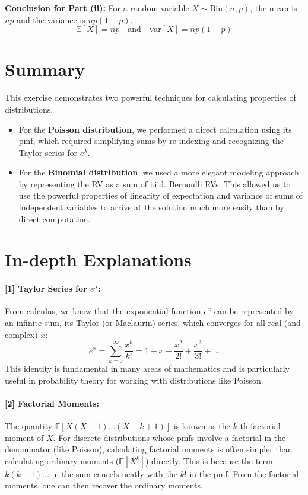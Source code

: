 \documentclass[11pt,a4paper]{article}
\theoremstyle{named}
\begin{document}
\textbf{Conclusion for Part (ii):} For a random variable $X \sim \text{Bin}(n,p)$, the mean is $np$ and the variance is $np(1-p)$.
\[
\mathbb{E}[X] = np \quad \text{and} \quad \text{var}[X] = np(1-p)
\]

\section{Summary}
This exercise demonstrates two powerful techniques for calculating properties of distributions.
\begin{itemize}
    \item For the \textbf{Poisson distribution}, we performed a direct calculation using its pmf, which required simplifying sums by re-indexing and recognizing the Taylor series for $e^\lambda$.
    \item For the \textbf{Binomial distribution}, we used a more elegant modeling approach by representing the RV as a sum of i.i.d. Bernoulli RVs. This allowed us to use the powerful properties of linearity of expectation and variance of sums of independent variables to arrive at the solution much more easily than by direct computation.
\end{itemize}

\newpage
\section*{In-depth Explanations}
\label{note:1}
\paragraph{[1] Taylor Series for $e^\lambda$:}
From calculus, we know that the exponential function $e^x$ can be represented by an infinite sum, its Taylor (or Maclaurin) series, which converges for all real (and complex) $x$:
\[
e^x = \sum_{k=0}^{\infty} \frac{x^k}{k!} = 1 + x + \frac{x^2}{2!} + \frac{x^3}{3!} + \dots
\]
This identity is fundamental in many areas of mathematics and is particularly useful in probability theory for working with distributions like Poisson.

\label{note:2}
\paragraph{[2] Factorial Moments:}
The quantity $\mathbb{E}[X(X-1)\dots(X-k+1)]$ is known as the $k$-th factorial moment of $X$. For discrete distributions whose pmfs involve a factorial in the denominator (like Poisson), calculating factorial moments is often simpler than calculating ordinary moments ($\mathbb{E}[X^k]$) directly. This is because the term $k(k-1)\dots$ in the sum cancels neatly with the $k!$ in the pmf. From the factorial moments, one can then recover the ordinary moments.
\end{document}
